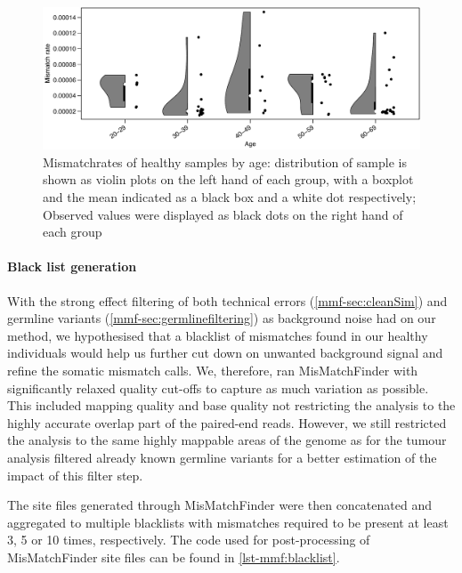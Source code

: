 \begin{figure}[ht]
\centering
\includegraphics[width=.99\linewidth]{Figures/MisMatchFinder/MisMatchRateByAge.pdf}
\caption[Mismatchrates of healthy samples by age]{Mismatchrates of healthy samples by age: distribution of sample is shown as violin plots on the left hand of each group, with a boxplot and the mean indicated as a black box and a white dot respectively; Observed values were displayed as black dots on the right hand of each group}\label{fig:mmf-mmrByAge}
\end{figure}


\paragraph{Black list generation}
\label{mmf-sec:healthyBlacklist}
With the strong effect filtering of both technical errors (\autoref{mmf-sec:cleanSim}) and germline variants (\autoref{mmf-sec:germlinefiltering}) as background noise had on our method, we hypothesised that a blacklist of mismatches found in our healthy individuals would help us further cut down on unwanted background signal and refine the somatic mismatch calls. We, therefore, ran MisMatchFinder with significantly relaxed quality cut-offs to capture as much variation as possible. This included  mapping quality and base quality  not restricting the analysis to the highly accurate overlap part of the paired-end reads. However, we still restricted the analysis to the same highly mappable areas of the genome as for the tumour analysis  filtered already known germline variants for a better estimation of the impact of this filter step.

The site files generated through MisMatchFinder were then concatenated and aggregated to multiple blacklists with mismatches required to be present at least 3, 5 or 10 times, respectively. The code used for post-processing of MisMatchFinder site files can be found in \autoref{lst-mmf:blacklist}.


